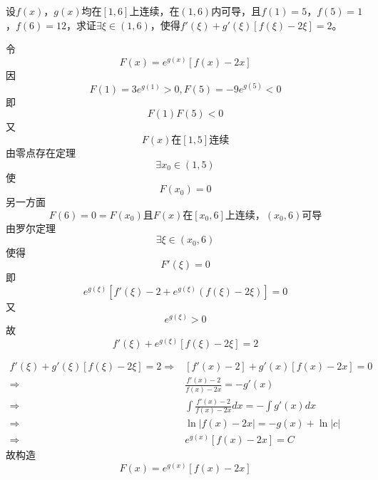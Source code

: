 \begin{example}
	设$f(x)$，$g(x)$均在$[1,6]$上连续，在$(1,6)$内可导，且$f(1)=5$，$f(5)=1$，$f(6)=12$，求证$\exists\xi\in(1,6)$，使得$f'(\xi)+g'(\xi)[f(\xi)-2\xi]=2$。
\end{example}
	\begin{newproof}
		令\[F\left( x \right) =e^{g\left( x \right)}\left[ f\left( x \right) -2x \right] \]
		因\[F\left( 1 \right) =3e^{g\left( 1 \right)}>0,F\left( 5 \right) =-9e^{g\left( 5 \right)}<0\]
		即\[F\left( 1 \right) F\left( 5 \right) <0\]
		又\[F\left( x \right) \text{在}\left[ 1,5 \right] \text{连续}\]
		由零点存在定理\[\exists x_0\in \left( 1,5 \right) \]
		使\[F\left( x_0 \right) =0\]
		另一方面\[F\left( 6 \right) =0=F\left( x_0 \right) \text{且}F\left( x \right) \text{在}\left[ x_0,6 \right] \text{上连续，}\left( x_0,6 \right) \text{可导}\]
		由罗尔定理\[\exists \xi \in \left( x_0,6 \right) \]
		使得\[F'\left( \xi \right) =0\]
		即\[e^{g\left( \xi \right)}\left[ f'\left( \xi \right) -2+e^{g\left( \xi \right)}\left( f\left( \xi \right) -2\xi \right) \right] =0\]
		又\[e^{g\left( \xi \right)}>0\]
		故\[f'\left( \xi \right) +e^{g\left( \xi \right)}\left[ f\left( \xi \right) -2\xi \right] =2\]
	\end{newproof}
	\begin{note}
		\begin{align*}
			f'\left( \xi \right) +g'\left( \xi \right) \left[ f\left( \xi \right) -2\xi \right] =2
			\Longrightarrow {}&
			\left[ f'\left( x \right) -2 \right] +g'\left( x \right) \left[ f\left( x \right) -2x \right] =0\\
			\Longrightarrow {}&
			\frac{f'\left( x \right) -2}{f\left( x \right) -2x}=-g'\left( x \right) \\
			\Longrightarrow {}&
			\int{\frac{f'\left( x \right) -2}{f\left( x \right) -2x}dx=-\int{g'\left( x \right) dx}}\\
			\Longrightarrow {}&
			\ln \left| f\left( x \right) -2x \right|=-g\left( x \right) +\ln \left| c \right|\\
			\Longrightarrow {}&
			e^{g\left( x \right)}\left[ f\left( x \right) -2x \right] =C
		\end{align*}
		故构造\[F(x) = e^{g\left( x \right)}\left[ f\left( x \right) -2x \right] \]
	\end{note}

